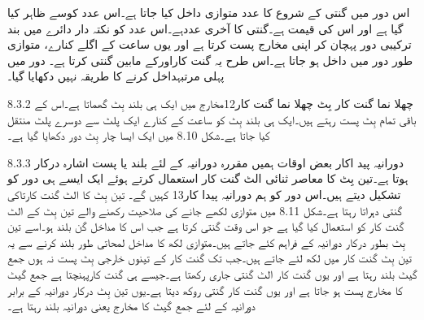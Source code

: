 	اس دور میں گنتی کے شروع کا عدد متوازی داخل کیا جاتا ہے۔اس عدد کوسے ظاہر کیا گیا ہے اور اس کی قیمت ہے۔گنتی کا آخری عددہے۔اس عدد کو نکتہ دار دائرے میں بند ترکیبی دور پہچان کر اپنی مخارج پست کرتا ہے اور یوں ساعت کے اگلے کنارے،  متوازی طور دور میں داخل ہو جاتا ہے۔اس طرح یہ  گنت کاراورکے مابین گنتی کرتا ہے۔
	دور میں پہلی مرتبہداخل کرنے کا طریقہ نہیں دکھایا گیا۔

8.3.2 چھلا نما گنت کار
	بِٹ چھلا نما گنت کار12مخارج میں ایک ہی بلند بِٹ گھماتا ہے۔اس کے باقی تمام بِٹ پست رہتے ہیں۔ایک ہی بلند بِٹ کو ساعت کے کنارے ایک پلٹ سے دوسرے پلٹ منتقل کیا جاتا ہے۔شکل 8.10 میں ایک ایسا چار بِٹ دور دکھایا گیا ہے۔


8.3.3 دورانیہ پید اکار
	بعض اوقات ہمیں مقررہ دورانیہ کے لئے بلند یا پست اشارہ درکار ہوتا ہے۔تین بِٹ کا معاصر ثنائی الٹ گنت کار استعمال کرتے ہوئے ایک ایسے ہی دور کو تشکیل دیتے ہیں۔اس دور کو ہم دورانیہ پیدا کار13 کہیں گے۔ 
	تین بِٹ کا الٹ گنت کارتاکی گنتی دہراتا رہتا ہے۔شکل 8.11 میں متوازی لکھے جانے کی صلاحیت رکھنے والے تین بِٹ کے الٹ گنت کار کو استعمال کیا گیا ہے جو اس وقت گنتی کرتا ہے جب اس کا مداخل گن بلند ہو۔اسے تین بِٹ بطور درکار دورانیہ کے فراہم کئے جاتے ہیں۔متوازی لکھ کا مداخل لمحاتی طور بلند کرنے سے یہ تین بِٹ گنت کار میں لکھ لئے جاتے ہیں۔جب تک گنت کار کے تینوں خارجی بِٹ پست نہ ہوں جمع گیٹ بلند رہتا ہے اور یوں گنت کار الٹ گنتی جاری رکھتا ہے۔جیسے ہی گنت کارپہنچتا ہے جمع گیٹ کا مخارج پست ہو جاتا ہے اور یوں گنت کار گنتی روکھ دیتا ہے۔یوں تین بِٹ درکار دورانیہ کے برابر دورانیہ کے لئے جمع گیٹ کا مخارج یعنی دورانیہ بلند رہتا ہے۔

